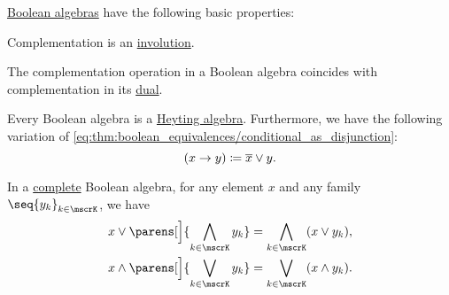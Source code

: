 \begin{proposition}\label{thm:def:boolean_algebra}
  \hyperref[def:boolean_algebra]{Boolean algebras} have the following basic properties:
  \begin{thmenum}
     Complementation is an \hyperref[def:involution]{involution}.

     The complementation operation in a Boolean algebra coincides with complementation in its \hyperref[def:boolean_algebra/opposite]{dual}.

     Every Boolean algebra is a \hyperref[def:heyting_algebra]{Heyting algebra}. Furthermore, we have the following variation of \eqref{eq:thm:boolean_equivalences/conditional_as_disjunction}:
    \begin{equation*}
      (x \rightarrow y) \coloneqq \oline {x} \vee y.
    \end{equation*}

     In a \hyperref[def:complete_lattice]{complete} Boolean algebra, for any element \( x \) and any family \( \seq{ y_k }_{k \in \mscrK} \), we have
    \begin{align}
      x \vee \parens[\Big]{ \bigwedge_{k \in \mscrK} y_k } &= \bigwedge_{k \in \mscrK} (x \vee y_k), \label{eq:thm:def:boolean_algebra/distributive/join_over_meet} \\
      x \wedge \parens[\Big]{ \bigvee_{k \in \mscrK} y_k } &= \bigvee_{k \in \mscrK} (x \wedge y_k). \label{eq:thm:def:boolean_algebra/distributive/meet_over_join}
    \end{align}
  \end{thmenum}
\end{proposition}
